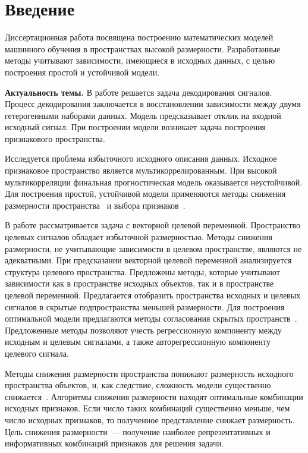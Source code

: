 \chapter*{Введение}

Диссертационная работа посвящена построению математических моделей машинного обучения в пространствах высокой размерности.
Разработанные методы учитывают зависимости, имеющиеся в исходных данных, с целью построения простой и устойчивой модели.

\textbf{Актуальность темы.} 
В работе решается задача декодирования сигналов. 
Процесс декодирования заключается в восстановлении зависимости между двумя гетерогенными наборами данных.
Модель предсказывает отклик на входной исходный сигнал.
При построении модели возникает задача построения признакового пространства. 

Исследуется проблема избыточного исходного описания данных. 
Исходное признаковое пространство является мультикоррелированным.
При высокой мультикорреляции финальная прогностическая модель оказывается неустойчивой.
Для построения простой, устойчивой модели применяются методы снижения размерности пространства~\cite{motrenko2018multi,chun2010sparse,mehmood2012review}  и выбора признаков~\cite{katrutsa2017comprehensive,li2017feature}.

В работе рассматривается задача с векторной целевой переменной. 
Пространство целевых сигналов обладает избыточной размерностью. 
Методы снижения размерности, не учитывающие зависимости в целевом пространстве, являются не адекватными.
При предсказании векторной целевой переменной анализируется структура целевого пространства.
Предложены методы, которые учитывают зависимости как в пространстве исходных объектов, так и в пространстве целевой переменной.
Предлагается отобразить пространства исходных и целевых сигналов в скрытые подпространства меньшей размерности.
Для построения оптимальной модели предлагаются методы согласования скрытых пространств~\cite{wold1975path,rosipal2005overview,eliseyev2017recursive}.
Предложенные методы позволяют учесть регрессионную компоненту между исходным и целевым сигналами, а также авторегрессионную компоненту целевого сигнала.

Методы снижения размерности пространства понижают размерность исходного пространства объектов, и, как следствие, сложность модели существенно снижается~\cite{tipping1999probabilisticpca,wold1975path,hotelling1992relations}. 
Алгоритмы снижения размерности находят оптимальные комбинации исходных признаков. 
Если число таких комбинаций существенно меньше, чем число исходных признаков, то полученное представление снижает размерность.
Цель снижения размерности~--- получение наиболее репрезентативных и информативных комбинаций признаков для решения задачи.

